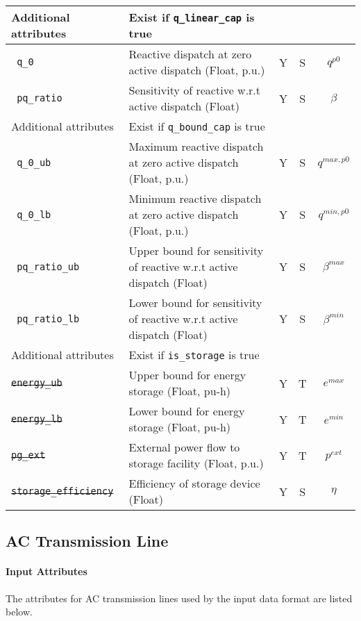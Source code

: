 \documentclass{article}
\begin{document}
\begin{center}
\small
\begin{tabular}{ l | l | c | c | c |}
 \hline
  Additional attributes & Exist if {\tt q\_linear\_cap} is true &  &  & \\
  \hline
  {\tt\color{red} q\_0}               & Reactive dispatch at zero active dispatch (Float, p.u.) & Y & S & $q^{p0}$\\
  {\tt\color{red} pq\_ratio}          & Sensitivity of reactive w.r.t active dispatch (Float) & Y & S & $\beta$\\
  \hline \hline
  Additional attributes & Exist if {\tt q\_bound\_cap} is true &  &  & \\
  \hline
  {\tt\color{red} q\_0\_ub}           & Maximum reactive dispatch at zero active dispatch (Float, p.u.) & Y & S & $q^{max,p0}$\\
  {\tt\color{red} q\_0\_lb}           & Minimum reactive dispatch at zero active dispatch (Float, p.u.) & Y & S & $q^{min,p0}$\\
  {\tt\color{red} pq\_ratio\_ub}      & Upper bound for sensitivity of reactive w.r.t active dispatch (Float) & Y & S & $\beta^{max}$\\
  {\tt\color{red} pq\_ratio\_lb}      & Lower bound for sensitivity of reactive w.r.t active dispatch (Float) & Y & S & $\beta^{min}$\\
  \hline 
  
  Additional attributes & Exist if {\tt is\_storage} is true &  &  & \\
  \hline
  \sout{\tt energy\_ub} & Upper bound for energy storage (Float, pu-h)& Y & T & $e^{max}$\\
  \sout{\tt energy\_lb} & Lower bound for energy storage (Float, pu-h)& Y & T & $e^{min}$\\ 
  \sout{\tt pg\_ext} & External power flow to storage facility (Float, p.u.)& Y & T & $p^{ext}$\\ 
  \sout{\tt storage\_efficiency} & Efficiency of storage device (Float) & Y & S & $\eta$\\
  \hline
\end{tabular}
\end{center}



\subsection{AC Transmission Line}
\label{nom:line}
\paragraph{Input Attributes}
The attributes for AC transmission lines used by the input data format are listed below.
\end{document}
